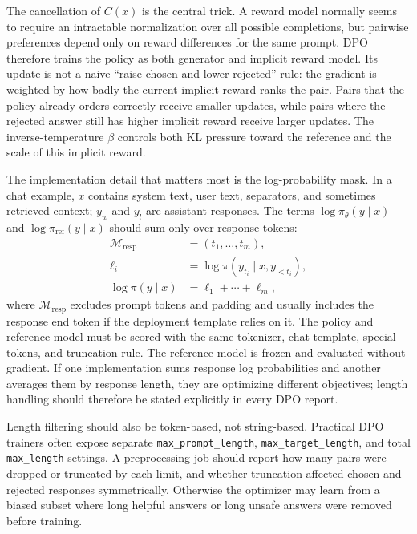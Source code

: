 The cancellation of $C(x)$ is the central trick. A reward model normally seems to require an intractable normalization over all possible completions, but pairwise preferences depend only on reward differences for the same prompt. DPO therefore trains the policy as both generator and implicit reward model. Its update is not a naive ``raise chosen and lower rejected'' rule: the gradient is weighted by how badly the current implicit reward ranks the pair. Pairs that the policy already orders correctly receive smaller updates, while pairs where the rejected answer still has higher implicit reward receive larger updates. The inverse-temperature $\beta$ controls both KL pressure toward the reference and the scale of this implicit reward.

The implementation detail that matters most is the log-probability mask. In a chat example, $x$ contains system text, user text, separators, and sometimes retrieved context; $y_w$ and $y_l$ are assistant responses. The terms $\log \pi_\theta(y\mid x)$ and $\log \pi_{\mathrm{ref}}(y\mid x)$ should sum only over response tokens:
\[
  \begin{aligned}
  \mathcal{M}_{\mathrm{resp}} &= (t_1,\ldots,t_m),\\
  \ell_i &= \log \pi(y_{t_i}\mid x,y_{<t_i}),\\
  \log \pi(y\mid x) &= \ell_1+\cdots+\ell_m,
  \end{aligned}
\]
where $\mathcal{M}_{\mathrm{resp}}$ excludes prompt tokens and padding and usually includes the response end token if the deployment template relies on it. The policy and reference model must be scored with the same tokenizer, chat template, special tokens, and truncation rule. The reference model is frozen and evaluated without gradient. If one implementation sums response log probabilities and another averages them by response length, they are optimizing different objectives; length handling should therefore be stated explicitly in every DPO report.

Length filtering should also be token-based, not string-based. Practical DPO trainers often expose separate \texttt{max\_prompt\_length}, \texttt{max\_target\_length}, and total \texttt{max\_length} settings. A preprocessing job should report how many pairs were dropped or truncated by each limit, and whether truncation affected chosen and rejected responses symmetrically. Otherwise the optimizer may learn from a biased subset where long helpful answers or long unsafe answers were removed before training.

